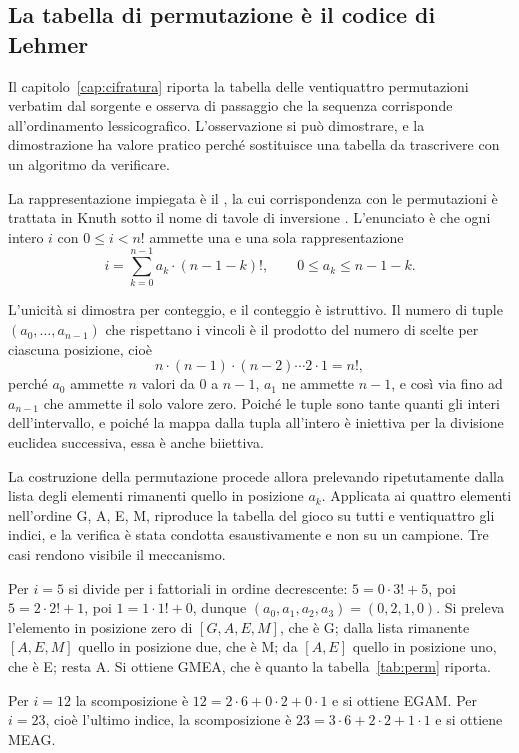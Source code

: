 \subsection{La tabella di permutazione è il codice di Lehmer}

Il capitolo~\ref{cap:cifratura} riporta la tabella delle ventiquattro permutazioni verbatim dal sorgente e osserva di passaggio che la sequenza corrisponde all'ordinamento lessicografico. L'osservazione si può dimostrare, e la dimostrazione ha valore pratico perché sostituisce una tabella da trascrivere con un algoritmo da verificare.

La rappresentazione impiegata è il , la cui corrispondenza con le permutazioni è trattata in Knuth sotto il nome di tavole di inversione \cite{knuth3}. L'enunciato è che ogni intero $i$ con $0 \le i < n!$ ammette una e una sola rappresentazione
\[
i = \sum_{k=0}^{n-1} a_k \cdot (n-1-k)!, \qquad 0 \le a_k \le n-1-k.
\]

L'unicità si dimostra per conteggio, e il conteggio è istruttivo. Il numero di tuple $(a_0, \dots, a_{n-1})$ che rispettano i vincoli è il prodotto del numero di scelte per ciascuna posizione, cioè
\[
n \cdot (n-1) \cdot (n-2) \cdots 2 \cdot 1 = n!,
\]
perché $a_0$ ammette $n$ valori da $0$ a $n-1$, $a_1$ ne ammette $n-1$, e così via fino ad $a_{n-1}$ che ammette il solo valore zero. Poiché le tuple sono tante quanti gli interi dell'intervallo, e poiché la mappa dalla tupla all'intero è iniettiva per la divisione euclidea successiva, essa è anche biiettiva.

La costruzione della permutazione procede allora prelevando ripetutamente dalla lista degli elementi rimanenti quello in posizione $a_k$. Applicata ai quattro elementi nell'ordine G, A, E, M, riproduce la tabella del gioco su tutti e ventiquattro gli indici, e la verifica è stata condotta esaustivamente e non su un campione. Tre casi rendono visibile il meccanismo.

Per $i = 5$ si divide per i fattoriali in ordine decrescente: $5 = 0 \cdot 3! + 5$, poi $5 = 2 \cdot 2! + 1$, poi $1 = 1 \cdot 1! + 0$, dunque $(a_0, a_1, a_2, a_3) = (0, 2, 1, 0)$. Si preleva l'elemento in posizione zero di $[G,A,E,M]$, che è G; dalla lista rimanente $[A,E,M]$ quello in posizione due, che è M; da $[A,E]$ quello in posizione uno, che è E; resta A. Si ottiene GMEA, che è quanto la tabella~\ref{tab:perm} riporta.

Per $i = 12$ la scomposizione è $12 = 2 \cdot 6 + 0 \cdot 2 + 0 \cdot 1$ e si ottiene EGAM. Per $i = 23$, cioè l'ultimo indice, la scomposizione è $23 = 3 \cdot 6 + 2 \cdot 2 + 1 \cdot 1$ e si ottiene MEAG.

